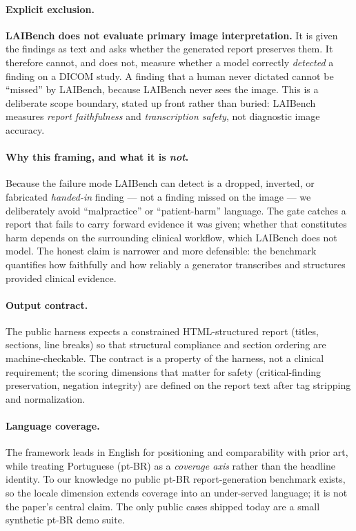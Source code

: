 \documentclass[11pt]{article}
\begin{document}
\paragraph{Explicit exclusion.} \textbf{LAIBench does not evaluate primary image
interpretation.} It is given the findings as text and asks whether the generated
report preserves them. It therefore cannot, and does not, measure whether a model
correctly \emph{detected} a finding on a DICOM study. A finding that a human
never dictated cannot be ``missed'' by LAIBench, because LAIBench never sees the
image. This is a deliberate scope boundary, stated up front rather than buried:
LAIBench measures \emph{report faithfulness} and \emph{transcription safety},
not diagnostic image accuracy.

\paragraph{Why this framing, and what it is \emph{not}.} Because the failure mode
LAIBench can detect is a dropped, inverted, or fabricated \emph{handed-in}
finding --- not a finding missed on the image --- we deliberately avoid
``malpractice'' or ``patient-harm'' language. The gate catches a report that
fails to carry forward evidence it was given; whether that constitutes harm
depends on the surrounding clinical workflow, which LAIBench does not model. The
honest claim is narrower and more defensible: the benchmark quantifies how
faithfully and how reliably a generator transcribes and structures provided
clinical evidence.

\paragraph{Output contract.} The public harness expects a constrained
HTML-structured report (titles, sections, line breaks) so that structural
compliance and section ordering are machine-checkable. The contract is a
property of the harness, not a clinical requirement; the scoring dimensions that
matter for safety (critical-finding preservation, negation integrity) are
defined on the report text after tag stripping and normalization.

\paragraph{Language coverage.} The framework leads in English for positioning and
comparability with prior art, while treating Portuguese (pt-BR) as a
\emph{coverage axis} rather than the headline identity. To our knowledge no
public pt-BR report-generation benchmark exists, so the locale dimension extends
coverage into an under-served language; it is not the paper's central claim. The
only public cases shipped today are a small synthetic pt-BR demo suite.
\end{document}
